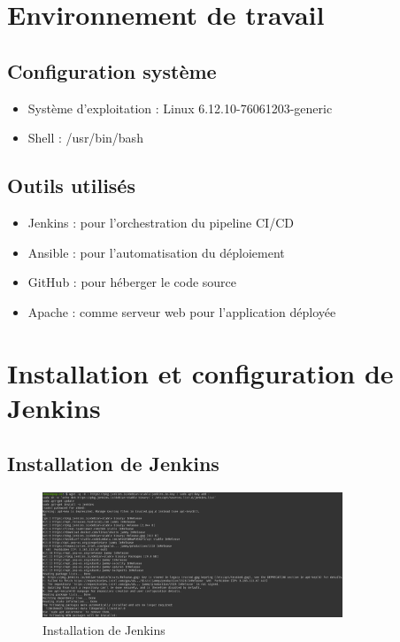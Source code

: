 \documentclass{article}
\begin{document}
\section{Environnement de travail}
\subsection{Configuration système}
\begin{itemize}
    \item Système d'exploitation : Linux 6.12.10-76061203-generic
    \item Shell : /usr/bin/bash
\end{itemize}

\subsection{Outils utilisés}
\begin{itemize}
    \item Jenkins : pour l'orchestration du pipeline CI/CD
    \item Ansible : pour l'automatisation du déploiement
    \item GitHub : pour héberger le code source
    \item Apache : comme serveur web pour l'application déployée
\end{itemize}

\section{Installation et configuration de Jenkins}
\subsection{Installation de Jenkins}

\begin{figure}[h]
    \centering
    \includegraphics[width=0.8\textwidth]{images/jenkins_installation.png}
    \caption{Installation de Jenkins}
    \label{fig:jenkins_installation}
\end{figure}
\end{document}
